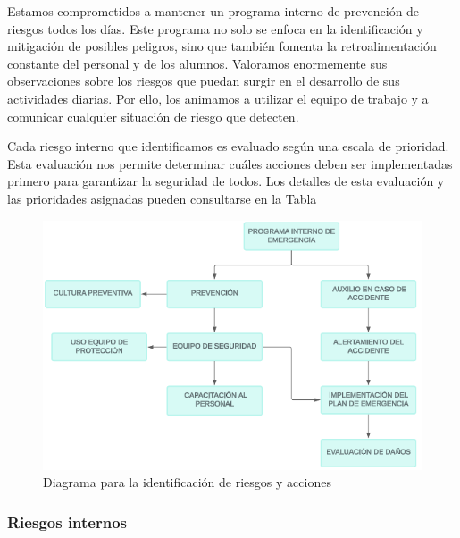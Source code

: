     Estamos comprometidos a mantener un programa interno de prevención de riesgos todos los días. Este programa no solo se enfoca en la identificación y mitigación de posibles peligros, sino que también fomenta la retroalimentación constante del personal y de los alumnos. Valoramos enormemente sus observaciones sobre los riesgos que puedan surgir en el desarrollo de sus actividades diarias. Por ello, los animamos a utilizar el equipo de trabajo y a comunicar cualquier situación de riesgo que detecten.
    
    Cada riesgo interno que identificamos es evaluado según una escala de prioridad. Esta evaluación nos permite determinar cuáles acciones deben ser implementadas primero para garantizar la seguridad de todos. Los detalles de esta evaluación y las prioridades asignadas pueden consultarse en la Tabla 
    
    \begin{figure}[H]
        \centering
        \includegraphics[scale=0.4]{35/Img/diagramaPE.png}
        \caption{Diagrama para la identificación de riesgos y acciones}
    \end{figure}
    
    \subsubsection{Riesgos internos}
    
